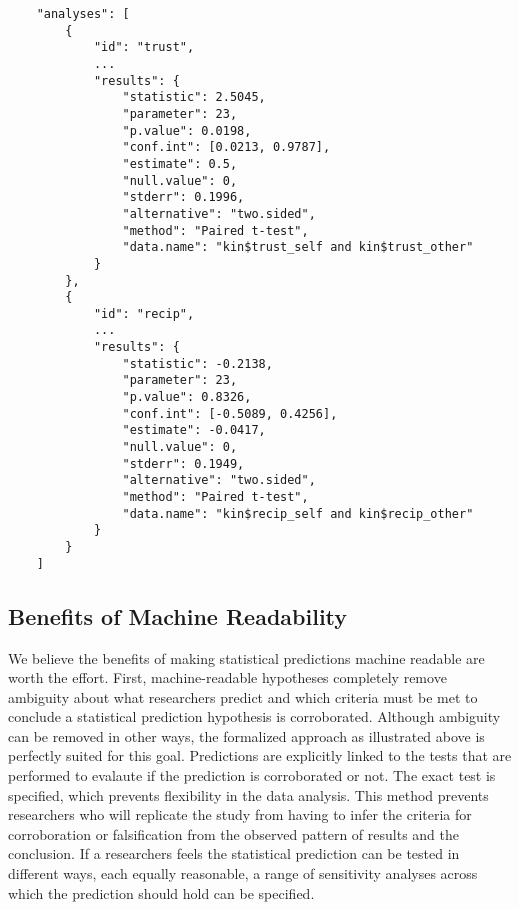 \documentclass[english,doc,floatsintext]{apa6}
\begin{document}
\begin{tcolorbox}[colback=black!5!white,colframe=white!5!black,title=Box 7. Results of data analysis.]
\begin{verbatim}
    "analyses": [
        {
            "id": "trust",
            ...
            "results": {
                "statistic": 2.5045,
                "parameter": 23,
                "p.value": 0.0198,
                "conf.int": [0.0213, 0.9787],
                "estimate": 0.5,
                "null.value": 0,
                "stderr": 0.1996,
                "alternative": "two.sided",
                "method": "Paired t-test",
                "data.name": "kin$trust_self and kin$trust_other"
            }
        },
        {
            "id": "recip",
            ...
            "results": {
                "statistic": -0.2138,
                "parameter": 23,
                "p.value": 0.8326,
                "conf.int": [-0.5089, 0.4256],
                "estimate": -0.0417,
                "null.value": 0,
                "stderr": 0.1949,
                "alternative": "two.sided",
                "method": "Paired t-test",
                "data.name": "kin$recip_self and kin$recip_other"
            }
        }
    ]
\end{verbatim}
\end{tcolorbox}

\hypertarget{benefits-of-machine-readability}{%
\subsection{Benefits of Machine Readability}\label{benefits-of-machine-readability}}

We believe the benefits of making statistical predictions machine readable are worth the effort. First, machine-readable hypotheses completely remove ambiguity about what researchers predict and which criteria must be met to conclude a statistical prediction hypothesis is corroborated. Although ambiguity can be removed in other ways, the formalized approach as illustrated above is perfectly suited for this goal. Predictions are explicitly linked to the tests that are performed to evalaute if the prediction is corroborated or not. The exact test is specified, which prevents flexibility in the data analysis. This method prevents researchers who will replicate the study from having to infer the criteria for corroboration or falsification from the observed pattern of results and the conclusion. If a researchers feels the statistical prediction can be tested in different ways, each equally reasonable, a range of sensitivity analyses across which the prediction should hold can be specified.
\end{document}
